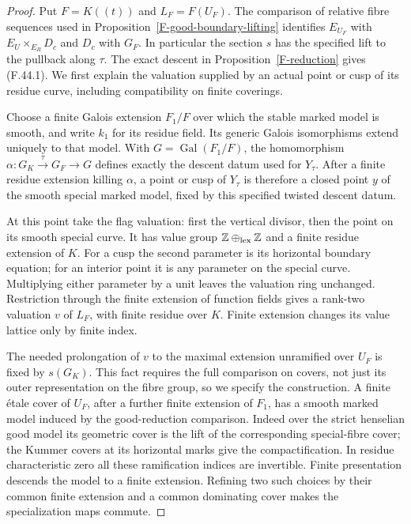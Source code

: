 \begin{proof}
Put $F=K((t))$ and $L_F=F(U_F)$. The comparison of relative
fibre sequences used in Proposition~\ref{F-good-boundary-lifting}
identifies $E_{U_F}$ with $E_U\times_{E_B}D_c$ and
$D_c$ with $G_F$. In particular the section $s$ has the
specified lift to the pullback along $\tau$. The exact
descent in Proposition~\ref{F-reduction} gives (F.44.1).
We first explain the valuation supplied by an actual
point or cusp of its residue curve, including compatibility
on finite coverings.

Choose a finite Galois extension $F_1/F$ over which the
stable marked model is smooth, and write $k_1$ for its
residue field. Its generic Galois isomorphisms extend
uniquely to that model. With $G=\operatorname{Gal}(F_1/F)$,
the homomorphism $\alpha:G_K\xrightarrow{\tau}G_F\to G$
defines exactly the descent datum used for $Y_\tau$.
After a finite residue extension killing $\alpha$, a
point or cusp of $Y_\tau$ is therefore a closed point
$y$ of the smooth special marked model, fixed by this
specified twisted descent datum.

At this point take the flag valuation: first the vertical
divisor, then the point on its smooth special curve.
It has value group $\mathbb Z\oplus_{\rm lex}\mathbb Z$
and a finite residue extension of $K$. For a cusp the
second parameter is its horizontal boundary equation;
for an interior point it is any parameter on the special
curve. Multiplying either parameter by a unit leaves
the valuation ring unchanged. Restriction through the
finite extension of function fields gives a rank-two
valuation $v$ of $L_F$, with finite residue over $K$.
Finite extension changes its value lattice only by finite
index.

The needed prolongation of $v$ to the maximal extension
unramified over $U_F$ is fixed by $s(G_K)$. This fact
requires the full comparison on covers, not just its
outer representation on the fibre group, so we specify
the construction. A finite \'etale cover of $U_F$,
after a further finite extension of $F_1$, has a smooth
marked model induced by the good-reduction comparison.
Indeed over the strict henselian good model its geometric
cover is the lift of the corresponding special-fibre
cover; the Kummer covers at its horizontal marks give
the compactification. In residue characteristic zero
all these ramification indices are invertible. Finite
presentation descends the model to a finite extension.
Refining two such choices by their common finite
extension and a common dominating cover makes the
specialization maps commute.


\end{proof}
